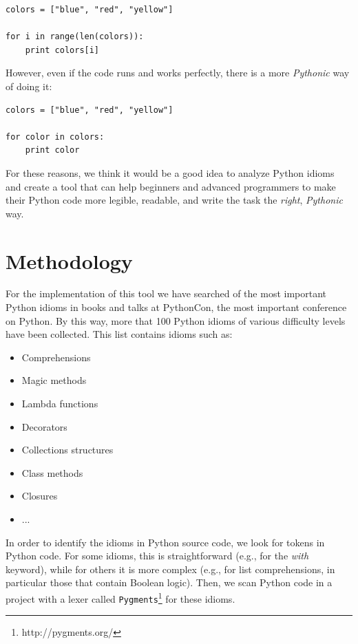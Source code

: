 \documentclass[conference]{IEEEtran}
\begin{document}
\begin{verbatim}
colors = ["blue", "red", "yellow"]

for i in range(len(colors)):
    print colors[i]
\end{verbatim}

However, even if the code runs and works perfectly, there is a more \emph{Pythonic} way of
doing it:

\begin{verbatim}
colors = ["blue", "red", "yellow"]

for color in colors:
    print color
\end{verbatim}

For these reasons, we think it would be a good idea to analyze Python idioms and create a tool that can help beginners and advanced programmers to make their Python code more legible, readable, and write the task the \emph{right}, \emph{Pythonic} way.

\section{Methodology}

For the implementation of this tool we have searched of the most important Python idioms in books and talks at PythonCon, the most important conference on Python. By this way, more that 100 Python idioms of various difficulty levels have been collected. This list contains idioms such as:

\begin{itemize}
\item Comprehensions
\item Magic methods
\item Lambda functions
\item Decorators
\item Collections structures
\item Class methods
\item Closures
\item ...
\end{itemize}

In order to identify the idioms in Python source code, we look for tokens in Python code. For some idioms, this is straightforward (e.g., for the \emph{with} keyword), while for others it is more complex (e.g., for list comprehensions, in particular those that contain Boolean logic). Then, we scan Python code in a project with a lexer called \texttt{Pygments}\footnote{http://pygments.org/} for these idioms.
\end{document}

